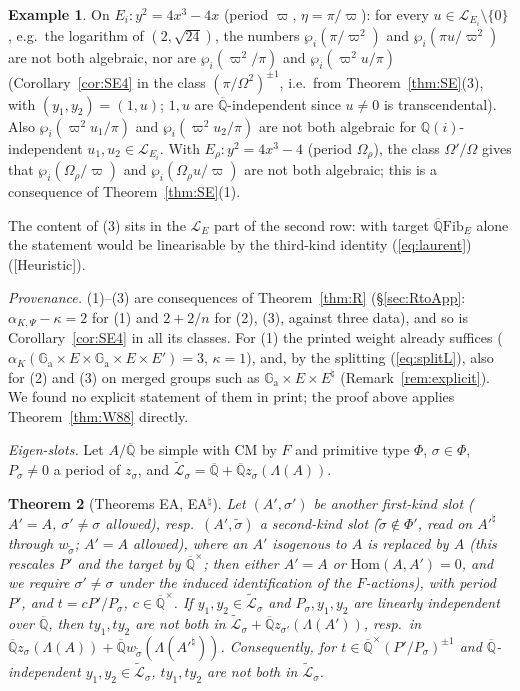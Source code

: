 \documentclass[11pt]{amsart}
\newtheorem{theorem}{Theorem}[section]
\theoremstyle{definition}
\newtheorem{example}[theorem]{Example}
\newcommand{\Qb}{\overline{\mathbb{Q}}}
\newcommand{\Q}{\mathbb{Q}}
\newcommand{\Ga}{\mathbb{G}_{\mathrm a}}
\newcommand{\Lg}{\mathcal{L}}
\newcommand{\Lt}{\widetilde{\mathcal{L}}}
\newcommand{\vp}{\varpi}
\newcommand{\Fib}{\mathrm{Fib}}
\newcommand{\lab}[1]{\textup{[#1]}}
\begin{document}
\begin{example}\label{ex:SE}
On $E_i\colon y^2=4x^3-4x$ (period $\vp$, $\eta=\pi/\vp$): for every $u\in\Lg_{E_i}\setminus\{0\}$, e.g.\ the logarithm of
$(2,\sqrt{24})$, the numbers $\wp_i(\pi/\vp^2)$ and $\wp_i(\pi u/\vp^2)$ are not both algebraic, nor are $\wp_i(\vp^2/\pi)$
and $\wp_i(\vp^2u/\pi)$ (Corollary~\ref{cor:SE4} in the class $(\pi/\Omega^2)^{\pm1}$, i.e.\ from Theorem~\ref{thm:SE}(3),
with $(y_1,y_2)=(1,u)$; $1,u$ are $\Qb$-independent since $u\ne0$ is transcendental). Also $\wp_i(\vp^2u_1/\pi)$ and
$\wp_i(\vp^2u_2/\pi)$ are not both algebraic for $\Q(i)$-independent $u_1,u_2\in\Lg_{E_i}$. With $E_\rho\colon y^2=4x^3-4$
(period $\Omega_\rho$), the class $\Omega'/\Omega$ gives that $\wp_i(\Omega_\rho/\vp)$ and $\wp_i(\Omega_\rho u/\vp)$ are not
both algebraic; this is a consequence of Theorem~\ref{thm:SE}(1).
\end{example}

\noindent The content of (3) sits in the $\Lg_E$ part of the second row: with target $\Qb\Fib_E$ alone the statement
would be linearisable by the third-kind identity (\ref{eq:laurent}) (\lab{Heuristic}).

\noindent\emph{Provenance.} (1)--(3) are consequences of Theorem~\ref{thm:R} (\S\ref{sec:RtoApp}:
$\alpha_{K,\Psi}-\kappa=2$ for (1) and $2+2/n$ for (2), (3), against three data), and so is Corollary~\ref{cor:SE4} in all its
classes. For (1) the printed weight already suffices ($\alpha_K(\Ga\times E\times\Ga\times E\times E')=3$, $\kappa=1$), and, by
the splitting (\ref{eq:splitL}), also for (2) and (3) on merged groups such as $\Ga\times E\times E^\natural$
(Remark~\ref{rem:explicit}). We found no explicit statement of them in print; the proof above applies Theorem~\ref{thm:W88}
directly.

\smallskip
\noindent\emph{Eigen-slots.} Let $A/\Qb$ be simple with CM by $F$ and primitive type $\Phi$, $\sigma\in\Phi$, $P_\sigma\neq0$ a
period of $z_\sigma$, and $\Lt_\sigma=\Qb+\Qb z_\sigma(\Lambda(A))$.

\begin{theorem}[Theorems EA, EA$^\natural$]\label{thm:EA}
Let $(A',\sigma')$ be another first-kind slot ($A'=A$, $\sigma'\neq\sigma$ allowed), resp.\ $(A',\tilde\sigma)$ a
second-kind slot ($\tilde\sigma\notin\Phi'$, read on $A'^\natural$ through $w_{\tilde\sigma}$; $A'=A$ allowed), where an $A'$
isogenous to $A$ is replaced by $A$ (this rescales $P'$ and the target by $\Qb^\times$; then either $A'=A$ or
$\mathrm{Hom}(A,A')=0$, and we require $\sigma'\neq\sigma$ under the induced identification of the $F$-actions), with
period $P'$, and $t=cP'/P_\sigma$, $c\in\Qb^\times$. If $y_1,y_2\in\Lt_\sigma$ and $P_\sigma,y_1,y_2$ are linearly
independent over $\Qb$, then $ty_1,ty_2$ are not both in $\Lt_\sigma+\Qb z_{\sigma'}(\Lambda(A'))$, resp.\ in
$\Qb z_\sigma(\Lambda(A))+\Qb w_{\tilde\sigma}(\Lambda(A'^\natural))$. Consequently, for $t\in\Qb^\times(P'/P_\sigma)^{\pm1}$
and $\Qb$-independent $y_1,y_2\in\Lt_\sigma$, $ty_1,ty_2$ are not both in $\Lt_\sigma$.
\end{theorem}
\end{document}
